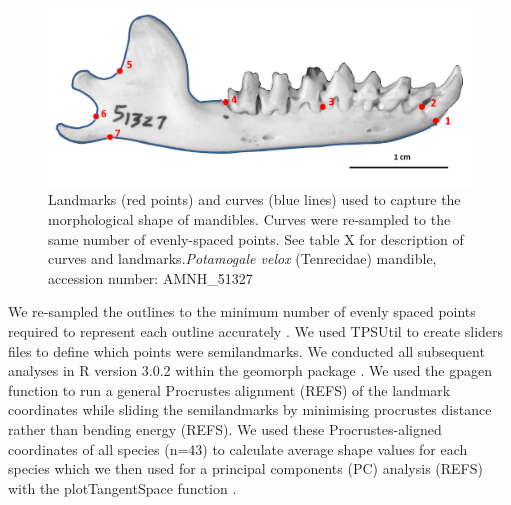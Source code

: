 \documentclass[12pt,a4paper]{article}
\begin{document}
\begin{table}[H]			
\centering
\caption{Descriptions of the landmarks (points) and curves (semilandmarks) for the skulls in dorsal view (see Figure \ref{fig:skdors_landmarks}).}
\label{tab:skdors_landmarks}  
\end{table}
\begin{figure}[H]
\centering
\includegraphics[width=1\linewidth]{figures/AMNH_51327_landmarksdiagram.png}

\caption{Landmarks (red points) and curves (blue lines) used to capture the morphological shape of mandibles. Curves were re-sampled to the same number of evenly-spaced points. See table X for description of curves and landmarks.\textit{Potamogale velox} (Tenrecidae) mandible, accession number: AMNH\_51327}
\label{fig:mands_landmarks}
\end{figure}


\begin{table}[H]			
\centering
\caption{Descriptions of the landmarks (points) and curves (semilandmarks) for the mandibles in lateral (buccal) view (see figure \ref{fig:mands_landmarks})}

\label{tab:mands_landmarks} %
\end{table}



We re-sampled the outlines to the minimum number of evenly spaced points required to represent each outline accurately \citep[][details in supplementary material]{MacLeod2013}. We used TPSUtil \citep{Rohlf2012} to create sliders files \citep{Zelditch2012} to define which points were semilandmarks. We conducted all subsequent analyses in R version 3.0.2 \citep[R Development Core][]{Team2013} within the geomorph package \citep{Adams2013}. We used the gpagen function to run a general Procrustes alignment (REFS) of the landmark coordinates while sliding the semilandmarks by minimising procrustes distance rather than bending energy (REFS). We used these Procrustes-aligned coordinates of all species (n=43) to calculate average shape values for each species which we then used for a principal components (PC) analysis (REFS) with the plotTangentSpace function \citep{Adams2013}. 
\end{document}
